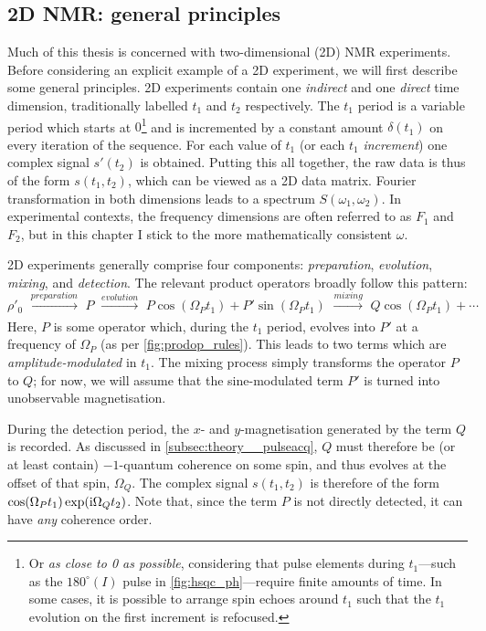 \subsection{2D NMR: general principles}
\label{subsec:theory__2dnmr}

Much of this thesis is concerned with two-dimensional (2D) NMR experiments.
Before considering an explicit example of a 2D experiment, we will first describe some general principles.\autocite{Aue1976JCP_2D,Jeener2016PNMRS}
2D experiments contain one \textit{indirect} and one \textit{direct} time dimension, traditionally labelled $t_1$ and $t_2$ respectively.
The $t_1$ period is a variable period which starts at $0$\footnote{Or \textit{as close to 0 as possible}, considering that pulse elements during $t_1$---such as the $180^\circ(I)$ pulse in \cref{fig:hsqc_ph}---require finite amounts of time. In some cases, it is possible to arrange spin echoes around $t_1$ such that the $t_1$ evolution on the first increment is refocused.} and is incremented by a constant amount $\delta(t_1)$ on every iteration of the sequence.
For each value of $t_1$ (or each $t_1$ \textit{increment}) one complex signal $s'(t_2)$ is obtained.
Putting this all together, the raw data is thus of the form $s(t_1, t_2)$, which can be viewed as a 2D data matrix.
Fourier transformation in both dimensions leads to a spectrum $S(\omega_1, \omega_2)$.
In experimental contexts, the frequency dimensions are often referred to as $F_1$ and $F_2$, but in this chapter I stick to the more mathematically consistent $\omega$.

2D experiments generally comprise four components: \textit{preparation}, \textit{evolution}, \textit{mixing}, and \textit{detection}.
The relevant product operators broadly follow this pattern:
\begin{equation}
    \label{eq:2d_pemd}
    \rho'_0 \,\,\xrightarrow[]{\textit{preparation}} \,\, P \,\, \xrightarrow[]{\textit{evolution}} \,\, P\cos(\Omega_P t_1) + P'\sin(\Omega_P t_1) \,\, \xrightarrow[]{\textit{mixing}} \,\, Q\cos(\Omega_P t_1) + \cdots
\end{equation}
Here, $P$ is some operator which, during the $t_1$ period, evolves into $P'$ at a frequency of $\Omega_P$ (as per \cref{fig:prodop_rules}).
This leads to two terms which are \textit{amplitude-modulated} in $t_1$.
The mixing process simply transforms the operator $P$ to $Q$; for now, we will assume that the sine-modulated term $P'$ is turned into unobservable magnetisation.

During the detection period, the $x$- and $y$-magnetisation generated by the term $Q$ is recorded.
As discussed in \cref{subsec:theory__pulseacq}, $Q$ must therefore be (or at least contain) $-1$-quantum coherence on some spin, and thus evolves at the offset of that spin, $\Omega_Q$.
The complex signal $s(t_1, t_2)$ is therefore of the form $\cos(\Omega_P t_1)\exp(\mathrm{i} \Omega_Q t_2)$.
Note that, since the term $P$ is not directly detected, it can have \textit{any} coherence order.

